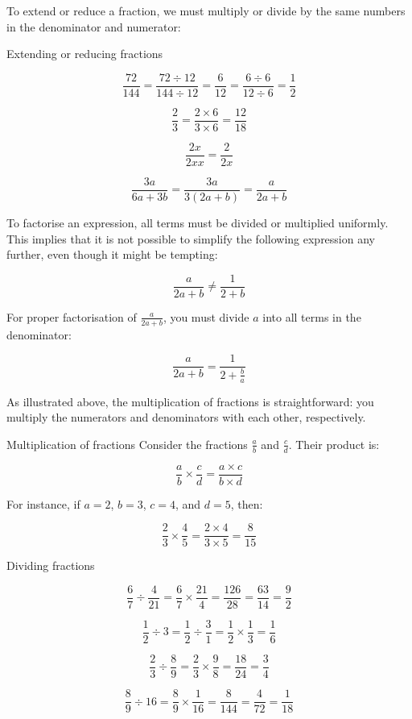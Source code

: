 To extend or reduce a fraction, we must multiply or divide by the same numbers in the denominator and numerator:

\begin{example} Extending or reducing fractions

\[
\frac{72}{144} = \frac{72 \div 12}{144 \div 12} = \frac{6}{12} = \frac{6 \div 6}{12 \div 6} = \frac{1}{2}
\]

\[
\frac{2}{3} = \frac{2 \times 6}{3 \times 6} = \frac{12}{18}
\]

\[
\frac{2x}{2xx} = \frac{2}{2x}
\]

\[
\frac{3a}{6a + 3b} = \frac{3a}{3(2a + b)} = \frac{a}{2a + b}
\]    
\end{example}

To factorise an expression, all terms must be divided or multiplied uniformly. This implies that it is not possible to simplify the following expression any further, even though it might be tempting:

\[
\frac{a}{2a + b} \neq \frac{1}{2 + b}
\]

For proper factorisation of \(\frac{a}{2a + b}\), you must divide \(a\) into all terms in the denominator:

\[
\frac{a}{2a + b} = \frac{1}{2 + \frac{b}{a}}
\]

As illustrated above, the multiplication of fractions is straightforward: you multiply the numerators and denominators with each other, respectively.

\begin{example} Multiplication of fractions \newline
Consider the fractions \(\frac{a}{b}\) and \(\frac{c}{d}\). Their product is:

\[
\frac{a}{b} \times \frac{c}{d} = \frac{a \times c}{b \times d}
\]

For instance, if \(a = 2\), \(b = 3\), \(c = 4\), and \(d = 5\), then:

\[
\frac{2}{3} \times \frac{4}{5} = \frac{2 \times 4}{3 \times 5} = \frac{8}{15}
\]
  
\end{example} 

\begin{example} Dividing fractions

\[
\frac{6}{7} \div \frac{4}{21} = \frac{6}{7} \times \frac{21}{4} = \frac{126}{28} = \frac{63}{14} = \frac{9}{2}
\]

\[
\frac{1}{2} \div 3 = \frac{1}{2} \div \frac{3}{1} = \frac{1}{2} \times \frac{1}{3} = \frac{1}{6}
\]

\[
\frac{2}{3} \div \frac{8}{9} = \frac{2}{3} \times \frac{9}{8} = \frac{18}{24} = \frac{3}{4}
\]

\[
\frac{8}{9} \div 16 = \frac{8}{9} \times \frac{1}{16} = \frac{8}{144} = \frac{4}{72} = \frac{1}{18}
\]
  
\end{example}

